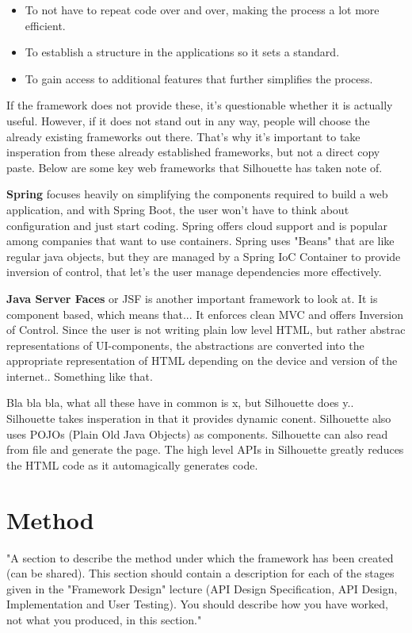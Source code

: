 \documentclass[12pt]{article}
\begin{document}
\begin{itemize}
    \item To not have to repeat code over and over, making the process a lot more efficient.
    \item To establish a structure in the applications so it sets a standard.
    \item To gain access to additional features that further simplifies the process.
\end{itemize}

If the framework does not provide these, it's questionable whether it is actually useful. However, if it does not stand out in any way, people will choose the already existing frameworks out there. That's why it's important to take insperation from these already established frameworks, but not a direct copy paste. Below are some key web frameworks that Silhouette has taken note of.

\textbf{Spring} focuses heavily on simplifying the components required to build a web application, and with Spring Boot, the user won't have to think about configuration and just start coding. Spring offers cloud support and is popular among companies that want to use containers. Spring uses "Beans" that are like regular java objects, but they are managed by a Spring IoC Container to provide inversion of control, that let's the user manage dependencies more effectively.

\textbf{Java Server Faces} or JSF is another important framework to look at. It is component based, which means that... It enforces clean MVC and offers Inversion of Control. Since the user is not writing plain low level HTML, but rather abstrac representations of UI-components, the abstractions are converted into the appropriate representation of HTML depending on the device and version of the internet.. Something like that.

Bla bla bla, what all these have in common is x, but Silhouette does y..
Silhouette takes insperation in that it provides dynamic conent. Silhouette also uses POJOs (Plain Old Java Objects) as components. Silhouette can also read from file and generate the page. The high level APIs in Silhouette greatly reduces the HTML code as it automagically generates code.

\section{Method}
"A section to describe the method under which the framework has been created (can be shared). This section should contain a description for each of the stages given in the "Framework Design" lecture (API Design Specification, API Design, Implementation and User Testing). 
You should describe how you have worked, not what you produced, in this section."
\end{document}
